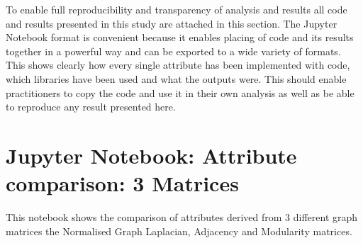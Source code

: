 \documentclass[12pt, oneside]{report}
\begin{document}
To enable full reproducibility and transparency of analysis and results all code and results presented in this study are attached in this section. The Jupyter Notebook format is convenient because it enables placing of code and its results together in a powerful way and can be exported to a wide variety of formats. \\

This shows clearly how every single attribute has been implemented with code, which libraries have been used and what the outputs were. This should enable practitioners to copy the code and use it in their own analysis as well as be able to reproduce any result presented here.



\chapter{Jupyter Notebook: Attribute comparison: 3 Matrices}

This notebook shows the comparison of attributes derived from 3 different graph matrices the Normalised Graph Laplacian, Adjacency and Modularity matrices. \\


\end{document}
